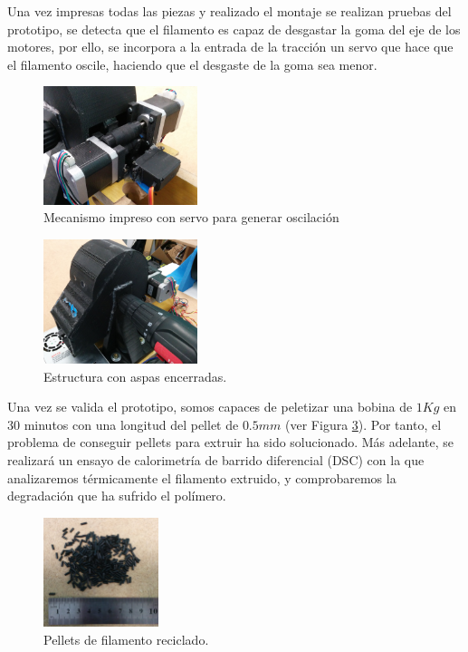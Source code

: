 Una vez impresas todas las piezas y realizado el montaje se realizan pruebas del prototipo, se detecta que el filamento es capaz de desgastar la goma del eje de los motores, por ello, se incorpora a la entrada de la tracción un servo que hace que el filamento oscile, haciendo que el desgaste de la goma sea menor.

\begin{figure}[H]
    \centering
    \includegraphics[width=0.4\textwidth]{images/peletizadora/IMG_20150818_172903.jpg}
    \caption{Mecanismo impreso con servo para generar oscilación}
    \label{fig:peletizadora_mecanismo}
\end{figure}

\begin{figure}[H]
    \centering
    \includegraphics[width=0.4\textwidth]{images/peletizadora/IMG_20150818_172917.jpg}
    \caption{Estructura con aspas encerradas.}
    \label{fig:peletizadora_mecanismo2}
\end{figure}

Una vez se valida el prototipo, somos capaces de peletizar una bobina de $1 Kg$ en 30 minutos con una longitud del pellet de $0.5 mm$ (ver Figura \ref{fig:peletizadora_pellets_reciclados}). Por tanto, el problema de conseguir pellets para extruir ha sido  solucionado. Más adelante, se realizará un ensayo de calorimetría de barrido diferencial (DSC) con la que analizaremos térmicamente el filamento extruido, y comprobaremos la degradación que ha sufrido el polímero.
    
\begin{figure}[H]
    \centering
    \includegraphics[width=0.3\textwidth]{images/peletizadora/IMG_20150819_112740.jpg}
    \caption{Pellets de filamento reciclado.}
    \label{fig:peletizadora_pellets_reciclados}
\end{figure}